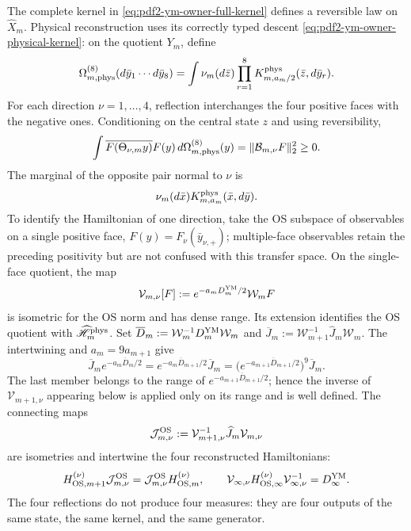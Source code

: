 The complete kernel in \eqref{eq:pdf2-ym-owner-full-kernel} defines a reversible law
on $\widehat X_m$. Physical reconstruction uses its correctly typed descent
\eqref{eq:pdf2-ym-owner-physical-kernel}: on the quotient $Y_m$, define
\begin{equation}\label{eq:pdf2-ym-owner-eight-face-law}
 \Omega_{m,{\rm phys}}^{(8)}(d\bar y_1\cdots d\bar y_8)
 =\int\nu_m(d\bar z)
  \prod_{r=1}^8K_{m,a_m/2}^{\rm phys}(\bar z,d\bar y_r).
\end{equation}
For each direction $\nu=1,\ldots,4$, reflection interchanges the four positive
faces with the negative ones. Conditioning on the central state $z$ and using
reversibility,
\begin{equation}\label{eq:pdf2-ym-owner-four-os}
 \int\overline{F(\Theta_{\nu,m}y)}F(y)\,
 d\Omega_{m,{\rm phys}}^{(8)}(y)
 =\|\mathcal B_{m,\nu}F\|_2^2\ge0.
\end{equation}
The marginal of the opposite pair normal to $\nu$ is
\begin{equation}\label{eq:pdf2-ym-owner-os-marginal}
 \nu_m(d\bar x)K_{m,a_m}^{\rm phys}(\bar x,d\bar y).
\end{equation}
To identify the Hamiltonian of one direction, take the OS subspace of
observables on a single positive face,
$F(y)=F_\nu(\bar y_{\nu,+})$; multiple-face observables retain the
preceding positivity but are not confused with this transfer space. On the
single-face quotient, the map
\begin{equation}\label{eq:pdf2-ym-owner-os-unitary}
 \mathcal V_{m,\nu}[F]
 :=e^{-a_mD_m^{\rm YM}/2}\mathcal W_mF
\end{equation}
is isometric for the OS norm and has dense range. Its extension identifies the
OS quotient with $\widehat{\mathscr H}_m^{\rm phys}$. Set
$\overline D_m:=\mathcal W_m^{-1}D_m^{\rm YM}\mathcal W_m$ and
$\overline J_m:=\mathcal W_{m+1}^{-1}\widehat J_m\mathcal W_m$. The
intertwining and $a_m=9a_{m+1}$ give
\begin{equation}\label{eq:pdf2-ym-owner-os-range-inclusion}
 \overline J_me^{-a_m\overline D_m/2}
 =e^{-a_m\overline D_{m+1}/2}\overline J_m
 =\bigl(e^{-a_{m+1}\overline D_{m+1}/2}\bigr)^9\overline J_m.
\end{equation}
The last member belongs to the range of
$e^{-a_{m+1}\overline D_{m+1}/2}$; hence the inverse of $\mathcal V_{m+1,\nu}$
appearing below is applied only on its range and is well defined. The
connecting maps
\begin{equation}\label{eq:pdf2-ym-owner-os-connectors}
 \mathcal J_{m,\nu}^{\rm OS}
 :=\mathcal V_{m+1,\nu}^{-1}\widehat J_m\mathcal V_{m,\nu}
\end{equation}
are isometries and intertwine the four reconstructed Hamiltonians:
\begin{equation}\label{eq:pdf2-ym-owner-common-os-hamiltonian}
 H_{{\rm OS},m+1}^{(\nu)}\mathcal J_{m,\nu}^{\rm OS}
 =\mathcal J_{m,\nu}^{\rm OS}H_{{\rm OS},m}^{(\nu)},
 \qquad
 \mathcal V_{\infty,\nu}H_{{\rm OS},\infty}^{(\nu)}
 \mathcal V_{\infty,\nu}^{-1}=D_\infty^{\rm YM}.
\end{equation}
The four reflections do not produce four measures: they are four outputs of the same
state, the same kernel, and the same generator.

